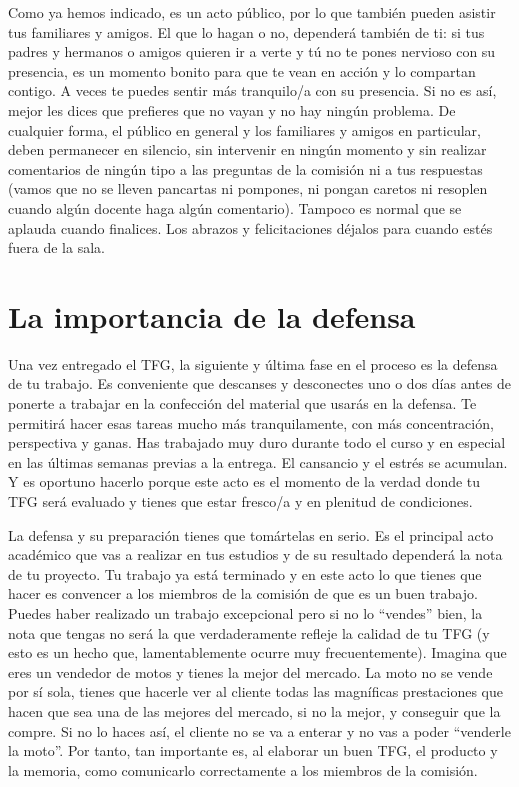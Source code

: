 Como ya hemos indicado, es un acto público, por lo que también pueden asistir tus familiares y amigos. El que lo hagan o no, dependerá también de ti: si tus padres y hermanos o amigos quieren ir a verte y tú no te pones nervioso con su presencia, es un momento bonito para que te vean en acción y lo compartan contigo. A veces te puedes sentir más tranquilo/a con su presencia. Si no es así, mejor les dices que prefieres que no vayan y no hay ningún problema. De cualquier forma, el público en general y los familiares y amigos en particular, deben permanecer en silencio, sin intervenir en ningún momento y sin realizar comentarios de ningún tipo a las preguntas de la comisión ni a tus respuestas (vamos que no se lleven pancartas ni pompones, ni pongan caretos ni resoplen cuando algún docente haga algún comentario). Tampoco es normal que se aplauda cuando finalices. Los abrazos y felicitaciones déjalos para cuando estés fuera de la sala.

\section{La importancia de la defensa}


Una vez entregado el TFG, la siguiente y última fase en el proceso es la defensa de tu trabajo. Es conveniente que descanses y desconectes uno o dos días antes de ponerte a trabajar en la confección del material que usarás en la defensa. Te permitirá hacer esas tareas mucho más tranquilamente, con más concentración, perspectiva y ganas. Has trabajado muy duro durante todo el curso y en especial en las últimas semanas previas a la entrega. El cansancio y el estrés se acumulan. Y es oportuno hacerlo porque este acto es el momento de la verdad donde tu TFG será evaluado y tienes que estar fresco/a y en plenitud de condiciones.

La defensa y su preparación tienes que tomártelas en serio. Es el principal acto académico que vas a realizar en tus estudios y de su resultado dependerá la nota de tu proyecto. Tu trabajo ya está terminado y en este acto lo que tienes que hacer es convencer a los miembros de la comisión de que es un buen trabajo. Puedes haber realizado un trabajo excepcional pero si no lo ``vendes'' bien, la nota que tengas no será la que verdaderamente refleje la calidad de tu TFG (y esto es un hecho que, lamentablemente ocurre muy frecuentemente). Imagina que eres un vendedor de motos y tienes la mejor del mercado. La moto no se vende por sí sola, tienes que hacerle ver al cliente todas las magníficas prestaciones que hacen que sea una de las mejores del mercado, si no la mejor, y conseguir que la compre. Si no lo haces así, el cliente no se va a enterar y no vas a poder ``venderle la moto''. Por tanto, tan importante es, al elaborar un buen TFG, el producto y la memoria, como comunicarlo correctamente a los miembros de la comisión. 

